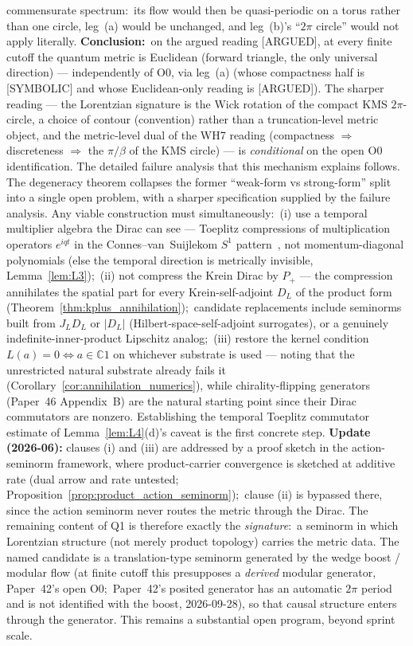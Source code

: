 \documentclass[11pt,a4paper]{article}
\theoremstyle{plain}
\theoremstyle{definition}
\newcommand{\Sone}{S^{1}}
\newcommand{\C}{\mathbb{C}}
\newcommand{\DL}{D_{L}}
\newcommand{\JL}{J_{L}}
\newcommand{\Pplus}{P_{+}}
\begin{document}
\begin{enumerate}
commensurate spectrum:\ its flow would then be quasi-periodic on a torus
rather than one circle, leg~(a) would be unchanged, and leg~(b)'s ``$2\pi$
circle'' would not apply literally. \textbf{Conclusion:}\ on the argued
reading [ARGUED], at every finite
cutoff the quantum metric is Euclidean (forward triangle, the only universal
direction) --- independently of O0, via leg~(a) (whose compactness half is
[SYMBOLIC] and whose Euclidean-only reading is [ARGUED]). The sharper reading --- the
Lorentzian signature is the Wick rotation of the compact KMS $2\pi$-circle,
a choice of contour (convention) rather than a truncation-level metric object, %
and the metric-level dual of the WH7 reading (compactness $\Rightarrow$
discreteness $\Rightarrow$ the $\pi/\beta$ of the KMS circle) --- is
\emph{conditional} on the open O0 identification. The detailed failure
analysis that this mechanism explains follows.
The degeneracy theorem collapses the former ``weak-form vs
strong-form'' split into a single open problem, with a sharper
specification supplied by the failure analysis. Any viable construction must simultaneously:\
(i) use a temporal multiplier algebra the Dirac can see — Toeplitz
compressions of multiplication operators $e^{iqt}$ in the
Connes--van~Suijlekom $\Sone$ pattern~\cite{connes_vs2021}, not
momentum-diagonal polynomials (else the temporal direction is
metrically invisible, Lemma~\ref{lem:L3});\
(ii) not compress the Krein Dirac by $\Pplus$ — the compression
annihilates the spatial part for every Krein-self-adjoint $\DL$ of
the product form (Theorem~\ref{thm:kplus_annihilation});\ candidate
replacements include seminorms built from $\JL\DL$ or $|\DL|$
(Hilbert-space-self-adjoint surrogates), or a genuinely
indefinite-inner-product Lipschitz analog;\
(iii) restore the kernel condition $L(a) = 0 \Leftrightarrow a \in
\C 1$ on whichever substrate is used — noting that the unrestricted
natural substrate already fails it (Corollary~\ref{cor:annihilation_numerics}),
while chirality-flipping generators (Paper~46 Appendix~B) are the
natural starting point since their Dirac commutators are nonzero.
Establishing the temporal Toeplitz commutator estimate of
Lemma~\ref{lem:L4}(d)'s caveat is the first concrete step.
\textbf{Update (2026-06):} clauses (i) and (iii) are addressed by a
proof sketch in the action-seminorm framework, where product-carrier
convergence is sketched at additive rate (dual arrow and rate untested;
Proposition~\ref{prop:product_action_seminorm});\ clause (ii) is
bypassed there, since the action seminorm never routes the metric
through the Dirac. The remaining content of Q1 is therefore exactly
the \emph{signature}:\ a seminorm in which Lorentzian structure (not
merely product topology) carries the metric data. The named candidate
is a translation-type seminorm generated by the wedge boost / modular
flow (at finite cutoff this presupposes a \emph{derived} modular
generator, Paper~42's open O0;\ Paper~42's posited generator has an
automatic $2\pi$ period and is not identified with the boost,
2026-09-28), so that causal structure enters through the generator. This
remains a substantial open program, beyond sprint scale.


\end{enumerate}
\end{document}
